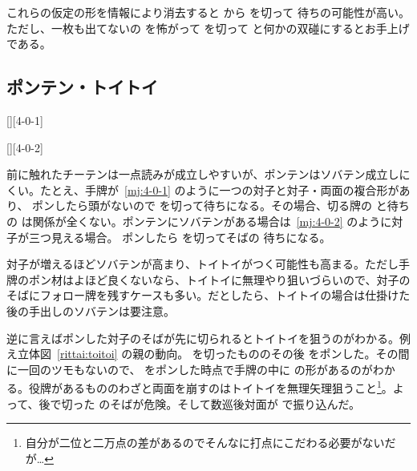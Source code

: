 \documentclass[../nankiru_main.tex]{subfiles}
\begin{document}
これらの仮定の形を情報により消去すると  から  を切って  待ちの可能性が高い。ただし、一枚も出てないの  を怖がって  を切って  と何かの双碰にするとお手上げである。

\subsection{ポンテン・トイトイ}

[][4-0-1]

[][4-0-2]

前に触れたチーテンは一点読みが成立しやすいが、ポンテンはソバテン成立しにくい\citep[][p.~67]{takizawa-yomi}。たとえ、手牌が~\ref{mj:4-0-1} のように一つの対子と対子・両面の複合形があり、 ポンしたら頭がないので  を切って待ちになる。その場合、切る牌の  と待ちの  は関係が全くない。ポンテンにソバテンがある場合は~\ref{mj:4-0-2} のように対子が三つ見える場合。 ポンしたら  を切ってそばの  待ちになる。

対子が増えるほどソバテンが高まり、トイトイがつく可能性も高まる\citep[][p.~68]{takizawa-yomi}。ただし手牌のポン材はよほど良くないなら、トイトイに無理やり狙いづらいので、対子のそばにフォロー牌を残すケースも多い。だとしたら、トイトイの場合は仕掛けた後の手出しのソバテンは要注意。

\begin{rittai}[h]
  \centering
  
  
  \caption{親が  をポンして打 。直後に対面が切った  をポンして  を切った。}
  \label{rittai:toitoi}
\end{rittai}

逆に言えばポンした対子のそばが先に切られるとトイトイを狙うのがわかる。例え立体図~\ref{rittai:toitoi} の親の動向。 を切ったもののその後  をポンした。その間に一回のツモもないので、 をポンした時点で手牌の中に  の形があるのがわかる。役牌があるもののわざと両面を崩すのはトイトイを無理矢理狙うこと\footnote{自分が二位と二万点の差があるのでそんなに打点にこだわる必要がないだが…}。よって、後で切った  のそばが危険。そして数巡後対面が  で振り込んだ。
\end{document}

